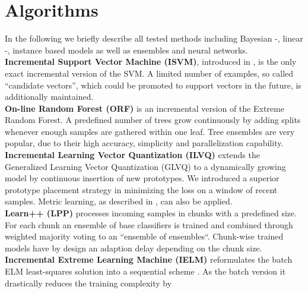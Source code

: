\documentclass{esann}
\begin{document}
\section{Algorithms}
In the following we briefly describe all tested methods including Bayesian -, linear -, instance based models as well as ensembles and
neural networks.\\
\textbf{Incremental Support Vector Machine (ISVM)}, introduced in \cite{cauwenbergs01incrementaldecremental}, is the only exact incremental version of the SVM.  
A limited number of examples, so called ``candidate vectors'', which could be promoted to support vectors in the future, is additionally maintained.\\
\textbf{On-line Random Forest (ORF)}\cite{5457447} is an incremental version of the Extreme Random Forest. 
A predefined number of trees grow continuously by adding splits whenever enough samples are gathered within one leaf.
Tree ensembles are very popular, due to their high accuracy, simplicity and parallelization capability. \\
\textbf{Incremental Learning Vector Quantization (ILVQ)} extends the Generalized Learning Vector Quantization (GLVQ) to a dynamically growing model by continuous insertion of new prototypes. 
We introduced a superior prototype placement strategy in \cite{7280610} minimizing the loss on a window of recent samples. Metric learning, as described in \cite{Schneider:2009:ARM:1737743.1737754}, %
can also be applied.\\
\textbf{Learn++ (LPP)}\cite{983933} processes incoming samples in chunks with a predefined size. For each chunk an ensemble of base classifiers is trained and combined through weighted majority voting to an ``ensemble of ensembles``.
Chunk-wise trained models have by design an adaption delay depending on the chunk size.\\
\textbf{Incremental Extreme Learning Machine (IELM)} reformulates the batch ELM least-squares solution into a sequential scheme \cite{4012031}. As the batch version it drastically reduces the training complexity by 
\end{document}
